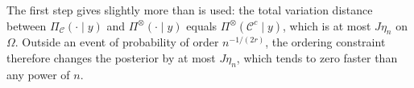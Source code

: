 The first step gives slightly more than is used: the total variation distance between $\Pi_{\mathcal C}(\cdot\mid y)$ and $\Pi^{\otimes}(\cdot\mid y)$ equals $\Pi^{\otimes}(\mathcal C^c\mid y)$, which is at most $J\eta_n$ on $\Omega$. Outside an event of probability of order $n^{-1/(2r)}$, the ordering constraint therefore changes the posterior by at most $J\eta_n$, which tends to zero faster than any power of $n$.
